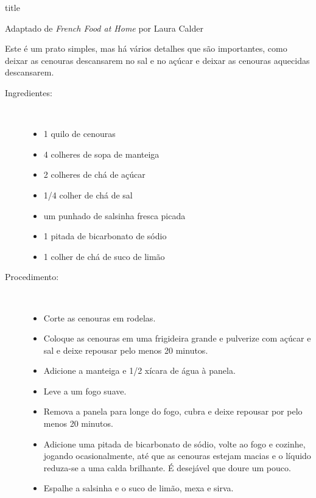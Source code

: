 \documentclass [11pt, letterpaper] {article}
\begin{document}
 {title}

\begin {flushright}
Adaptado de {\it French Food at Home} por Laura Calder
\end {flushright}

Este \'e um prato simples, mas h\'a v\'arios detalhes que s\~ao importantes, como deixar as cenouras descansarem no sal e no a\c{c}\'ucar e deixar as cenouras aquecidas descansarem.

\begin {description}

\item [Ingredientes:] \ \\
\begin {itemize}
\item 1 quilo de cenouras
\item 4 colheres de sopa de manteiga
\item 2 colheres de chá de açúcar
\item 1/4 colher de chá de sal
\item um punhado de salsinha fresca picada
\item 1 pitada de bicarbonato de sódio
\item 1 colher de chá de suco de limão
\end {itemize}

\item [Procedimento:] \ \\
\begin {itemize}
\item Corte as cenouras em rodelas.
\item Coloque as cenouras em uma frigideira grande e pulverize com açúcar e sal e deixe repousar pelo menos 20 minutos.
\item Adicione a manteiga e 1/2 xícara de água à panela.
\item Leve a um fogo suave.
\item Remova a panela para longe do fogo, cubra e deixe repousar por pelo menos 20 minutos.
\item Adicione uma pitada de bicarbonato de sódio, volte ao fogo e cozinhe, jogando ocasionalmente, até que as cenouras estejam macias
e o líquido reduza-se a uma calda brilhante. É desejável que doure um pouco.
\item Espalhe a salsinha e o suco de limão, mexa e sirva.
\end {itemize}

\end {description}
\end{document}
